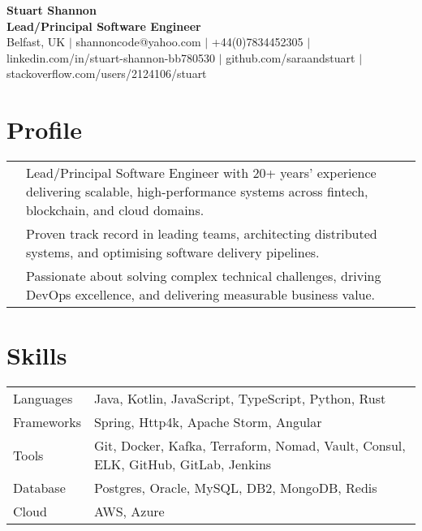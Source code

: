 \documentclass[2pt,a4paper]{article}
\newlength{\datecolumn}
\newlength{\textcolumn}
\begin{document}
\begin{center}
    {\LARGE \textbf{Stuart Shannon}} \\
    {\normalsize \textbf{Lead/Principal Software Engineer}} \\
    \vspace{0.2cm}
    Belfast, UK \quad \(|\) \quad shannoncode@yahoo.com \quad \(|\) \quad +44(0)7834452305 \quad \(|\) \quad linkedin.com/in/stuart-shannon-bb780530 \quad \(|\) \quad github.com/saraandstuart \quad \(|\) \quad stackoverflow.com/users/2124106/stuart 
\end{center}

\section*{Profile}
\begin{tabular}{p{\datecolumn} p{\textcolumn}}
& Lead/Principal Software Engineer with 20+ years’ experience delivering scalable, high-performance systems across fintech, blockchain, and cloud domains. \\
& Proven track record in leading teams, architecting distributed systems, and optimising software delivery pipelines. \\
& Passionate about solving complex technical challenges, driving DevOps excellence, and delivering measurable business value. \\
\end{tabular}

\section*{Skills}
\begin{tabular}{p{\datecolumn} p{\textcolumn}}
Languages  & Java, Kotlin, JavaScript, TypeScript, Python, Rust \\
Frameworks & Spring, Http4k, Apache Storm, Angular \\
Tools      & Git, Docker, Kafka, Terraform, Nomad, Vault, Consul, ELK, GitHub, GitLab, Jenkins \\
Database   & Postgres, Oracle, MySQL, DB2, MongoDB, Redis \\
Cloud      & AWS, Azure \\
\end{tabular}
\end{document}
